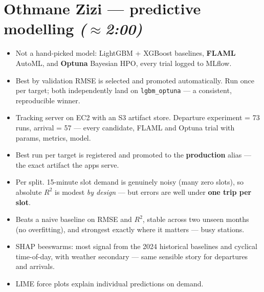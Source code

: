 \documentclass[11pt]{article}
\newcommand{\Rtwo}{$R^2$}
\newcommand{\presenter}[2]{\par\medskip\noindent{\color{#2}\rule{3pt}{12pt}}\hspace{4pt}{\bfseries #1}\par}
\newcommand{\timing}[1]{\hfill{\small\itshape\color{slate}(#1)}}
\begin{document}
\section{Othmane Zizi --- predictive modelling \timing{$\approx$2:00}}
\presenter{Slide 7 --- Modelling: a multi-model search, auto-selected}{blue}
\begin{itemize}
  \item Not a hand-picked model: LightGBM + XGBoost baselines, \textbf{FLAML} AutoML, and \textbf{Optuna}
        Bayesian HPO, every trial logged to MLflow.
  \item Best by validation RMSE is selected and promoted automatically. Run once per target; both
        independently land on \texttt{lgbm\_optuna} --- a consistent, reproducible winner.
\end{itemize}

\presenter{Slide 8 --- MLflow tracking + registry}{blue}
\begin{itemize}
  \item Tracking server on EC2 with an S3 artifact store. Departure experiment = 73 runs, arrival = 57
        --- every candidate, FLAML and Optuna trial with params, metrics, model.
  \item Best run per target is registered and promoted to the \textbf{production} alias --- the exact
        artifact the apps serve.
\end{itemize}

\presenter{Slide 9 --- Results}{blue}
\begin{itemize}
  \item Per split. 15-minute slot demand is genuinely noisy (many zero slots), so absolute \Rtwo{} is
        modest \emph{by design} --- but errors are well under \textbf{one trip per slot}.
  \item Beats a naive baseline on RMSE and \Rtwo{}, stable across two unseen months (no overfitting),
        and strongest exactly where it matters --- busy stations.
\end{itemize}

\presenter{Slide 10 --- Explainability: SHAP \& LIME}{blue}
\begin{itemize}
  \item SHAP beeswarms: most signal from the 2024 historical baselines and cyclical time-of-day, with
        weather secondary --- same sensible story for departures and arrivals.
  \item LIME force plots explain individual predictions on demand.
\end{itemize}
\end{document}
